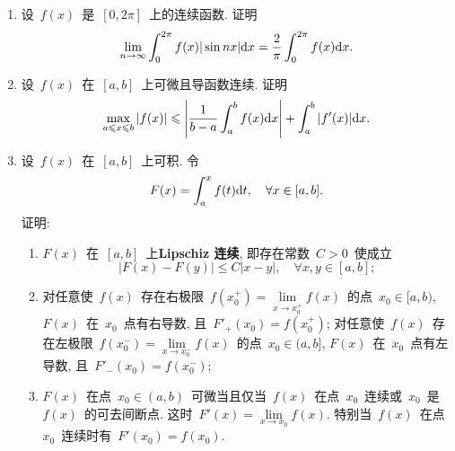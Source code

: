 \documentclass[UTF8,a4paper,20pt]{article}
\begin{document}
\begin{enumerate}
\item 设~$f(x)$~是~$[0,2\pi]$~上的连续函数. 证明
\[\lim_{n\to\infty}\int_0^{2\pi}f(x)|\sin{nx}|\mathrm{d}x=\dfrac{2}{\pi}\int_0^{2\pi}f(x)\mathrm{d}x.\]

\item 设~$f(x)$~在~$[a,b]$~上可微且导函数连续. 证明
\[\max_{a\leqslant x\leqslant b}|f(x)|\leqslant \left|\dfrac{1}{b-a}\int_a^b f(x)\mathrm{d}x\right|+\int_a^b|f'(x)|\mathrm{d}x.\]

\item 设~$f(x)$~在~$[a,b]$~上可积. 令
\[F(x)=\int_a^x f(t)\mathrm{d}t, \quad \forall x\in[a,b].\]
证明:
	\begin{enumerate}[(1)]
	\item $F(x)$~在~$[a,b]$~上{\bf Lipschiz 连续}, 即存在常数~$C>0$~使成立
		\[ |F(x)-F(y)|\leqslant C|x-y|, \quad\forall x,y\in[a,b];\]
	\item 对任意使~$f(x)$~存在右极限~$f(x_0^{+})=\lim\limits_{x\to x_0^{+}}f(x)$~的点~$x_0\in[a,b)$, $F(x)$~在~$x_0$~点有右导数, 且~$F'_{+}(x_0)=f(x_0^{+})$; 对任意使~$f(x)$~存在左极限~$f(x_0^{-})=\lim\limits_{x\to x_0^{-}}f(x)$~的点~$x_0\in(a,b]$, $F(x)$~在~$x_0$~点有左导数, 且~$F'_{-}(x_0)=f(x_0^{-})$; 
	\item $F(x)$~在点~$x_0\in(a,b)$~可微当且仅当~$f(x)$~在点~$x_0$~连续或~$x_0$~是~$f(x)$~的可去间断点. 这时~$F'(x)=\lim\limits_{x\to x_0} f(x)$. 特别当~$f(x)$~在点~$x_0$~连续时有~$F'(x_0)=f(x_0)$.
	\end{enumerate}
\end{enumerate}

\clearpage
\end{document}
